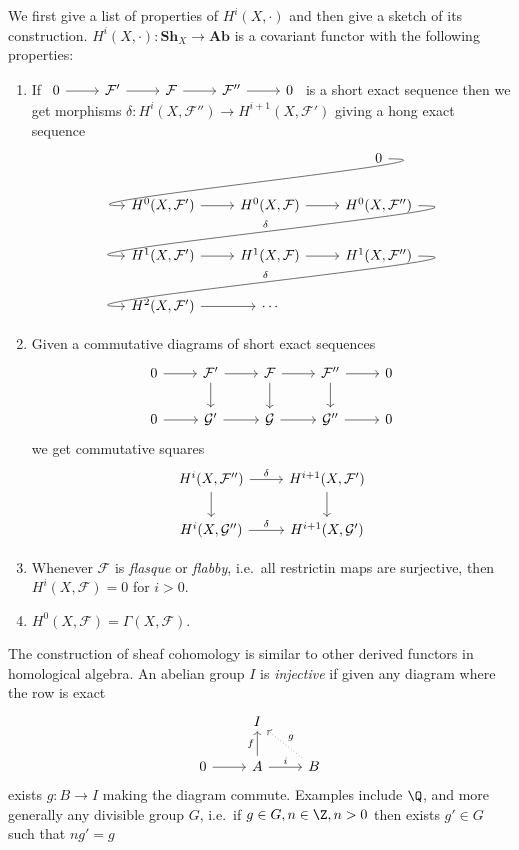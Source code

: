 \documentclass[a4paper]{article}
\renewcommand{\c}[1]{\mathbf{#1}} %
\newcommand{\sh}[1]{\mathcal{#1}} %
\begin{document}
We first give a list of properties of \(H^i(X, \cdot)\) and then give a sketch of its construction. \(H^i(X, \cdot): \c{Sh}_X \to \c{Ab}\) is a covariant functor with the following properties:
\begin{enumerate}
\item If \(\begin{tikzcd}
    0 \ar[r] & \sh F' \ar[r] & \sh F \ar[r] & \sh F'' \ar[r] & 0
  \end{tikzcd}
  \) is a short exact sequence then we get morphisms \(\delta: H^i(X, \sh F'') \to H^{i + 1}(X, \sh F')\) giving a hong exact sequence
  \[
    \begin{tikzcd}
      & & 0 \ar[dll, out=0, in=180, overlay] \\
      H^0(X, \sh F') \ar[r] & H^0(X, \sh F) \ar[r] & H^0(X, \sh F'') \ar[dll, "\delta"', out=0, in=180, overlay] \\
      H^1(X, \sh F') \ar[r] & H^1(X, \sh F) \ar[r] & H^1(X, \sh F'') \ar[dll, "\delta"', out=0, in=180, overlay] \\
      H^2(X, \sh F') \ar[r] & \cdots
    \end{tikzcd}
  \]
\item Given a commutative diagrams of short exact sequences
  \[
    \begin{tikzcd}
      0 \ar[r] & \sh F' \ar[r] \ar[d] & \sh F \ar[r] \ar[d] & \sh F'' \ar[r] \ar[d] & 0 \\
      0 \ar[r] & \sh G' \ar[r] & \sh G \ar[r] & \sh G'' \ar[r] & 0
    \end{tikzcd}
  \]
  we get commutative squares
  \[
    \begin{tikzcd}
      H^i(X, \sh F'') \ar[r, "\delta"] \ar[d] & H^{i + 1}(X, \sh F') \ar[d] \\
      H^i(X, \sh G'') \ar[r, "\delta"] & H^{i + 1}(X, \sh G')
    \end{tikzcd}
  \]
\item Whenever \(\sh F\) is \emph{flasque} or \emph{flabby}, i.e.\ all restrictin maps are surjective, then \(H^i(X, \sh F) = 0\) for \(i > 0\).
\item \(H^0(X, \sh F) = \Gamma(X, \sh F)\).
\end{enumerate}

The construction of sheaf cohomology is similar to other derived functors in homological algebra. An abelian group \(I\) is \emph{injective} if given any diagram where the row is exact
\[
  \begin{tikzcd}
    & I \\
    0 \ar[r] & A \ar[r, "i"] \ar[u, "f"] & B \ar[ul, dotted, "g"']
  \end{tikzcd}
\]
exists \(g: B \to I\) making the diagram commute. Examples include \(\Q\), and more generally any divisible group \(G\), i.e.\ if \(g \in G, n \in \Z, n > 0\) then exists \(g' \in G\) such that \(ng' = g\)
\end{document}
